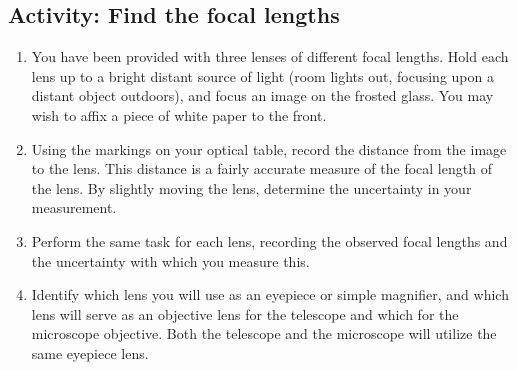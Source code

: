 \subsection{Activity: Find the focal lengths}
\begin{enumerate}
	\item You have been provided with three lenses of different focal lengths.  Hold each lens up to a bright distant source of light (room lights out, focusing upon a distant object outdoors), and focus an image on the frosted glass.  You may wish to affix a piece of white paper to the front. 
	\item Using the markings on your optical table, record the distance from the image to the lens. This distance is a fairly accurate measure of the focal length of the lens.  By slightly moving the lens, determine the uncertainty in your measurement. 
	\item Perform the same task for each lens, recording the observed focal lengths and the uncertainty with which you measure this.
	\item Identify which lens you will use as an eyepiece or simple magnifier, and which lens will serve as an objective lens for the telescope and which for the microscope objective. Both the telescope and the microscope will utilize the same eyepiece lens.
\end{enumerate}

